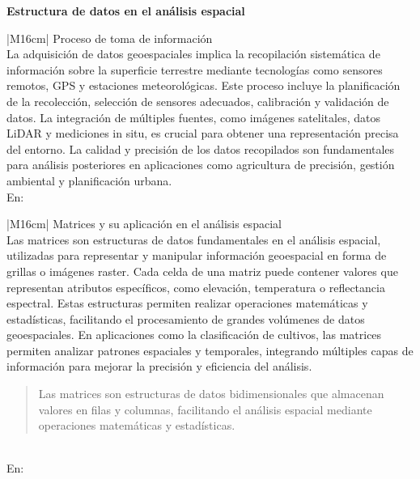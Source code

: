 \newpage

{\large\textbf{Estructura de datos en el análisis espacial}}
\begin{table}[h!]
  \centering
  \renewcommand{\arraystretch}{2} %
  \begin{tabular}{|M{16cm}|}
    \hline
    Proceso de toma de información \\
    \hline
    La adquisición de datos geoespaciales implica la recopilación sistemática de información sobre la superficie terrestre mediante tecnologías como sensores remotos, GPS y estaciones meteorológicas. Este proceso incluye la planificación de la recolección, selección de sensores adecuados, calibración y validación de datos. La integración de múltiples fuentes, como imágenes satelitales, datos LiDAR y mediciones in situ, es crucial para obtener una representación precisa del entorno. La calidad y precisión de los datos recopilados son fundamentales para análisis posteriores en aplicaciones como agricultura de precisión, gestión ambiental y planificación urbana.
    \\
    \hline
    En: \cite{Ram2024} \\
    \hline
  \end{tabular}
  \label{tab:argumento3}
\end{table}

\begin{table}[h!]
  \centering
  \renewcommand{\arraystretch}{2} %
  \begin{tabular}{|M{16cm}|}
    \hline
    Matrices y su aplicación en el análisis espacial \\
    \hline
    Las matrices son estructuras de datos fundamentales en el análisis espacial, utilizadas para representar y manipular información geoespacial en forma de grillas o imágenes raster. Cada celda de una matriz puede contener valores que representan atributos específicos, como elevación, temperatura o reflectancia espectral. Estas estructuras permiten realizar operaciones matemáticas y estadísticas, facilitando el procesamiento de grandes volúmenes de datos geoespaciales. En aplicaciones como la clasificación de cultivos, las matrices permiten analizar patrones espaciales y temporales, integrando múltiples capas de información para mejorar la precisión y eficiencia del análisis.
    \begin{quote}
      Las matrices son estructuras de datos bidimensionales que almacenan valores en filas y columnas, facilitando el análisis espacial mediante operaciones matemáticas y estadísticas.
    \end{quote}
    \\
    \hline
    En: \cite{Ram2024} \\
    \hline
  \end{tabular}
  \label{tab:argumento3b}
\end{table}

